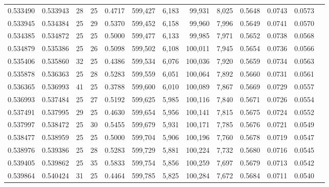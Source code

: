 \begin{tabular}{rrrrrrrrrrrrr}
0.533490 & 0.533943 &    28 &  25 &                                     0.4717 & 599,427 &   6,183 &  99,931 &   8,025 & 0.5648 & 0.0743 & 0.0573 \\
0.533945 & 0.534384 &    25 &  29 &                                     0.5370 & 599,452 &   6,158 &  99,960 &   7,996 & 0.5649 & 0.0741 & 0.0570 \\
0.534385 & 0.534872 &    25 &  25 &                                     0.5000 & 599,477 &   6,133 &  99,985 &   7,971 & 0.5652 & 0.0738 & 0.0568 \\
0.534879 & 0.535386 &    25 &  26 &                                     0.5098 & 599,502 &   6,108 & 100,011 &   7,945 & 0.5654 & 0.0736 & 0.0566 \\
0.535406 & 0.535860 &    32 &  25 &                                     0.4386 & 599,534 &   6,076 & 100,036 &   7,920 & 0.5659 & 0.0734 & 0.0563 \\
0.535878 & 0.536363 &    25 &  28 &                                     0.5283 & 599,559 &   6,051 & 100,064 &   7,892 & 0.5660 & 0.0731 & 0.0561 \\
0.536365 & 0.536993 &    41 &  25 &                                     0.3788 & 599,600 &   6,010 & 100,089 &   7,867 & 0.5669 & 0.0729 & 0.0557 \\
0.536993 & 0.537484 &    25 &  27 &                                     0.5192 & 599,625 &   5,985 & 100,116 &   7,840 & 0.5671 & 0.0726 & 0.0554 \\
0.537491 & 0.537995 &    29 &  25 &                                     0.4630 & 599,654 &   5,956 & 100,141 &   7,815 & 0.5675 & 0.0724 & 0.0552 \\
0.537997 & 0.538472 &    25 &  30 &                                     0.5455 & 599,679 &   5,931 & 100,171 &   7,785 & 0.5676 & 0.0721 & 0.0549 \\
0.538477 & 0.538959 &    25 &  25 &                                     0.5000 & 599,704 &   5,906 & 100,196 &   7,760 & 0.5678 & 0.0719 & 0.0547 \\
0.538976 & 0.539386 &    25 &  28 &                                     0.5283 & 599,729 &   5,881 & 100,224 &   7,732 & 0.5680 & 0.0716 & 0.0545 \\
0.539405 & 0.539862 &    25 &  35 &                                     0.5833 & 599,754 &   5,856 & 100,259 &   7,697 & 0.5679 & 0.0713 & 0.0542 \\
0.539864 & 0.540424 &    31 &  25 &                                     0.4464 & 599,785 &   5,825 & 100,284 &   7,672 & 0.5684 & 0.0711 & 0.0540 \\

\end{tabular}
